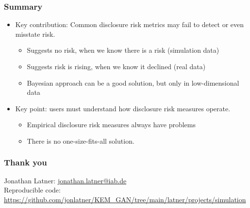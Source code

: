 \documentclass[t,8pt,utfx8]{beamer}
\begin{document}
\begin{spacing}{1.25}
\begin{frame}[t]\frametitle{Summary}

\begin{itemize}
    \item Key contribution: Common disclosure risk metrics may fail to detect or even misstate risk.  
    \begin{itemize}
        \item Suggests no risk, when we know there is a risk (simulation data)
        \item Suggests risk is rising, when we know it declined (real data)
        \item Bayesian approach can be a good solution, but only in low-dimensional data
    \end{itemize}
    \item Key point: users must understand how disclosure risk measures operate.  
    \begin{itemize}
        \item Empirical disclosure risk measures always have problems
        \item There is no one-size-fits-all solution.  
    \end{itemize}
\end{itemize}

\end{frame}

\begin{frame}[t]\frametitle{Thank you}

Jonathan Latner: \url{jonathan.latner@iab.de} \\

Reproducible code: \url{https://github.com/jonlatner/KEM\_GAN/tree/main/latner/projects/simulation} 


\end{frame}

\end{spacing}
\end{document}
